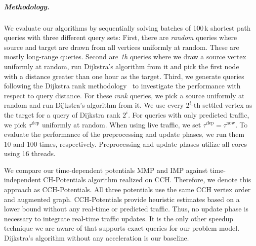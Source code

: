 \documentclass[a4paper,UKenglish,cleveref, autoref, thm-restate]{lipics-v2021}
\newcommand*{\tdep}{\tau^{\operatorname{dep}}}
\newcommand*{\tnow}{\tau^{\operatorname{now}}}
\begin{document}

\subparagraph{Methodology.}
We evaluate our algorithms by sequentially solving batches of 100\,k shortest path queries with three different query sets:
First, there are \emph{random} queries where source and target are drawn from all vertices uniformly at random.
These are mostly long-range queries.
Second are \emph{1h} queries where we draw a source vertex uniformly at random, run Dijkstra's algorithm from it and pick the first node with a distance greater than one hour as the target.
Third, we generate queries following the Dijkstra rank methodology~\cite{ss-hhhes-05} to investigate the performance with respect to query distance.
For these \emph{rank} queries, we pick a source uniformly at random and run Dijkstra's algorithm from it.
We use every $2^{i}$-th settled vertex as the target for a query of Dijkstra rank $2^i$.
For queries with only predicted traffic, we pick $\tdep$ uniformly at random.
When using live traffic, we set $\tdep = \tnow$.
To evaluate the performance of the preprocessing and update phases, we run them 10 and 100 times, respectively.
Preprocessing and update phases utilize all cores using 16 threads.

We compare our time-dependent potentials MMP and IMP against time-independent CH-Potentials algorithm realized on CCH.
Therefore, we denote this approach as CCH-Potentials.
All three potentials use the same CCH vertex order and augmented graph.
CCH-Potentials provide heuristic estimates based on a lower bound without any real-time or predicted traffic.
Thus, no update phase is necessary to integrate real-time traffic updates.
It is the only other speedup technique we are aware of that supports exact queries for our problem model.
Dijkstra's algorithm without any acceleration is our baseline.
\end{document}
